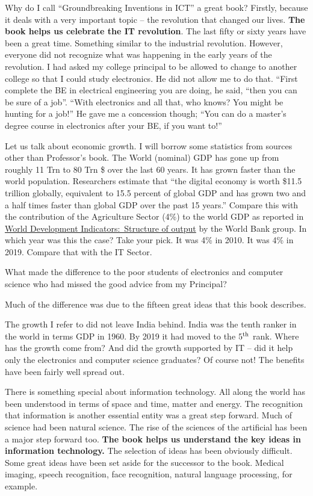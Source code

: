 \begin{multicols}{2}

Why do I call “Groundbreaking Inventions in ICT” a great book? Firstly, because it deals with a very important topic – the revolution that changed our lives. \textbf{The book helps us celebrate the IT revolution}. The last fifty or sixty years have been a great time. Something similar to the industrial revolution. However, everyone did not recognize what was happening in the early years of the revolution. I had asked my college principal to be allowed to change to another college so that I could study electronics. He did not allow me to do that. “First complete the BE in electrical engineering you are doing, he said, “then you can be sure of a job”. “With electronics and all that, who knows? You might be hunting for a job!” He gave me a concession though; “You can do a master’s degree course in electronics after your BE, if you want to!”

Let us talk about economic growth. I will borrow some statistics from sources other than Professor’s book. The World (nominal) GDP has gone up from roughly 11 Trn to 80 Trn \$ over the last 60 years. It has grown faster than the world population. Researchers estimate that “the digital economy is worth \$11.5 trillion globally, equivalent to 15.5 percent of global GDP and has grown two and a half times faster than global GDP over the past 15 years.” Compare this with the contribution of the Agriculture Sector (4\%) to the world GDP as reported in \underline{World Development Indicators: Structure of output} \cite{art3-key01} by the World Bank group. In which year was this the case? Take your pick. It was 4\% in 2010. It was 4\% in 2019. Compare that with the IT Sector.

What made the difference to the poor students of electronics and computer science who had missed the good advice from my Principal?

Much of the difference was due to the fifteen great ideas that this book describes. 

The growth I refer to did not leave India behind. India was the tenth ranker in the world in terms GDP in 1960. By 2019 it had moved to the $5^{\rm th}$ rank. Where has the growth come from?  And did the growth supported by IT – did it help only the electronics and computer science graduates? Of course not! The benefits have been fairly well spread out.

There is something special about information technology. All along the world has been understood in terms of space and time, matter and energy. The recognition that information is another essential entity was a great step forward. Much of science had been natural science. The rise of the sciences of the artificial has been a major step forward too. \textbf{The book helps us understand the key ideas in information technology.} The selection of ideas has been obviously difficult. Some great ideas have been set aside for the successor to the book. Medical imaging, speech recognition, face recognition, natural language processing, for example. 


\end{multicols}
